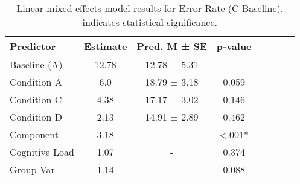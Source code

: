 
    \begin{table}[H]
    \centering
    \begin{small}
    \begin{tabular}{lccccccc}
\toprule
Predictor & Estimate & Pred. M ± SE & p-value \\
\midrule
Baseline (A) & 12.78 & 12.78 ± 5.31 & - \\
Condition A & 6.0 & 18.79 ± 3.18 & 0.059 \\
Condition C & 4.38 & 17.17 ± 3.02 & 0.146 \\
Condition D & 2.13 & 14.91 ± 2.89 & 0.462 \\
Component & 3.18 & - & <.001* \\
Cognitive Load & 1.07 & - & 0.374 \\
Group Var & 1.14 & - & 0.088 \\
\bottomrule
\end{tabular}

    \end{small}
    \caption[Linear mixed-effects model results for Error Rate (C Baseline)]{Linear mixed-effects model results for Error Rate (C Baseline). \newline * indicates statistical significance.}
    \label{tab:errorrate (c baseline)}

    \end{table}